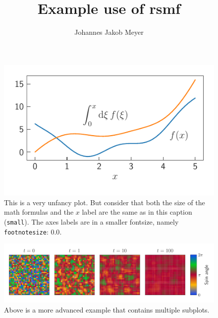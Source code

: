 \documentclass[a4paper,12pt]{quantumarticle}
\title{Example use of rsmf}
\author{Johannes Jakob Meyer}
\begin{document}
\maketitle

\lipsum[1-2]

\begin{figure}
	\centering
	\includegraphics{annotated_plot}
	\caption{This is a very unfancy plot. But consider that both the size of the math formulas and the $x$ label are the same as in this caption (\texttt{small}). The axes labels are in a smaller fontsize, namely \texttt{footnotesize}: {\footnotesize 0.0}.}
\end{figure}

\lipsum[11-12]

\begin{figure}
\centering
\includegraphics{spins}
\caption{Above is a more advanced example that contains multiple subplots.}
\end{figure}

\lipsum[21-22]
\end{document}
